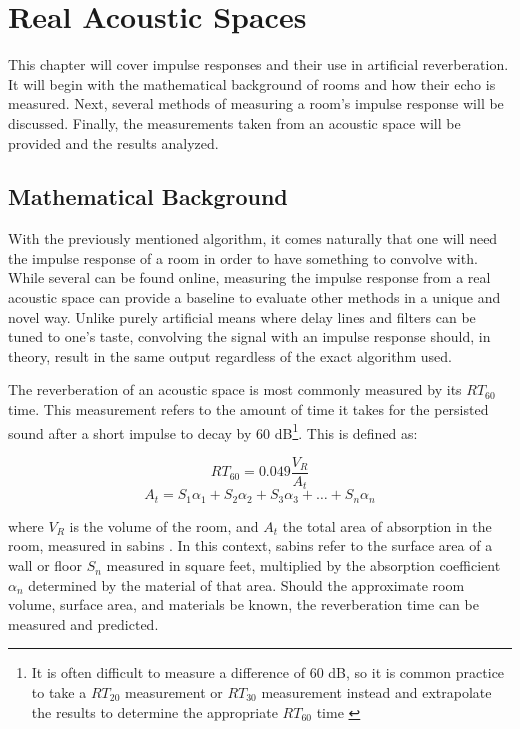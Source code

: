 \chapter{Real Acoustic Spaces}
\hspace*{-0.15cm}This chapter will cover impulse responses and their use in artificial reverberation. It will begin with the mathematical background of rooms and how their echo is measured. Next, several methods of measuring a room's impulse response will be discussed. Finally, the measurements taken from an acoustic space will be provided and the results analyzed.

\section{Mathematical Background}
With the previously mentioned algorithm, it comes naturally that one will need the impulse response of a room in order to have something to convolve with. While several can be found online, measuring the impulse response from a real acoustic space can provide a baseline to evaluate other methods in a unique and novel way. Unlike purely artificial means where delay lines and filters can be tuned to one's taste, convolving the signal with an impulse response should, in theory, result in the same output regardless of the exact algorithm used.

The reverberation of an acoustic space is most commonly measured by its $RT_{60}$ time. This measurement refers to the amount of time it takes for the persisted sound after a short impulse to decay by 60 dB\footnote{It is often difficult to measure a difference of 60 dB, so it is common practice to take a $RT_{20}$ measurement or $RT_{30}$ measurement instead and extrapolate the results to determine the appropriate $RT_{60}$ time \cite{larson}}. This is defined as:

\begin{defn}\label{def-complex}
	\begin{equation}\label{reverbtime-complex)}
	RT_{60} = 0.049 \frac{V_R}{A_{t}}
\end{equation}\begin{equation}\label{parttwo}
	A_t = S_1\alpha_1 + S_2\alpha_2 + S_3\alpha_3 + \ldots + S_n\alpha_n
\end{equation}
\end{defn}

where $V_R$ is the volume of the room, and $A_{t}$ the total area of absorption in the room, measured in sabins \cite{LONG2014313}. In this context, sabins refer to the surface area of a wall or floor $S_n$ measured in square feet, multiplied by the absorption coefficient $\alpha_n$ determined by the material of that area. Should the approximate room volume, surface area, and materials be known, the reverberation time can be measured and predicted.

